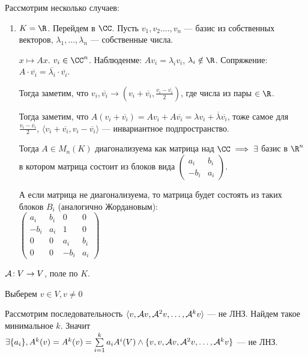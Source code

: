 Рассмотрим несколько случаев:
\begin{enumerate}
    \item $K = \R$. Перейдем в  $\CC$. Пусть  $v_1, v_2. \ldots, v_n$ --- базис из собственных векторов, $\lambda_1, \ldots, \lambda_n$ --- собственные числа.

        $x \mapsto Ax$.  $v_i \in \CC^n$.  Наблюденме: $Av_i = \lambda_i v_i$,  $\lambda_i \notin \R$. Сопряжение:  $A \cdot \overline{v_i} = \overline{\lambda_i} \cdot \overline{v_i}$. 

        Тогда заметим, что $v_i, \overline{v_i} \to \left(v_i + \overline{v_i}, \frac{v_i - \overline{v_i}}{2}\right)$, где числа из пары $\in \R$. 

        Тогда заметим, что $A(v_i + \overline{v_i}) = Av_i + A\overline{v_i} = \lambda v_i + \overline{\lambda} \overline{v_i}$, тоже самое для  $\frac{v_i - \overline{v_i}}{2}$, $\langle v_i + \overline{v_i}, v_i - \overline{v_i} \rangle $ --- инвариантное подпространство.  

        Тогда $A \in M_n(K)$ диагонализуема как матрица над $\CC \implies \exists$ базис в  $\R^n$ в котором матрица состоит из блоков вида $\begin{pmatrix} a_i & b_i \\ -b_i & a_i\end{pmatrix}$. 

        А если матрица не диагонализуема, то матрица будет состоять из таких блоков $B_i$ (аналогично Жордановым):\\ $\begin{pmatrix} a_i & b_i & 0 & 0 \\ -b_i & a_i & 1 & 0 \\ 0 & 0 & a_{i} & b_{i} \\ 0 & 0 & -b_{i} & a_{i} \end{pmatrix}$
\end{enumerate}
$\mathcal{A}\!: V \to V$, поле по  $K$.

Выберем  $v \in V, v \neq 0$

Рассмотрим последовательность $\langle v, \mathcal{A} v, \mathcal{A}^2 v,\ldots, \mathcal{A}^k v \rangle$ --- не ЛНЗ. Найдем такое минимальное $k$. Значит $\exists \{a_i\}, A^k(v) = A^k(v) = \sum\limits_{i=1}^k a_i A^i(V) \land \{v, v, \mathcal{A} v, \mathcal{A}^2 v,\ldots, \mathcal{A}^k v\}$ --- не ЛНЗ.

